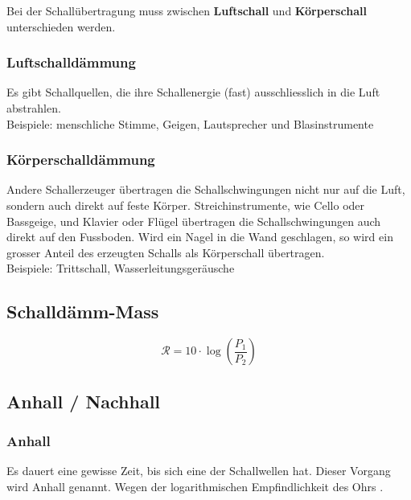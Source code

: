 Bei der Schallübertragung muss zwischen \textbf{Luftschall} und \textbf{Körperschall}
unterschieden werden.

\subsubsection{Luftschalldämmung}

Es gibt Schallquellen, die ihre Schallenergie (fast)
ausschliesslich in die Luft abstrahlen.\\
Beispiele: menschliche Stimme, Geigen, Lautsprecher und Blasinstrumente

\subsubsection{Körperschalldämmung}

Andere Schallerzeuger übertragen die Schallschwingungen nicht nur auf die
Luft, sondern auch direkt auf feste Körper. Streichinstrumente, wie Cello oder
Bassgeige, und Klavier oder Flügel übertragen die Schallschwingungen auch
direkt auf den Fussboden. Wird ein Nagel in die Wand geschlagen, so wird ein
grosser Anteil des erzeugten Schalls als Körperschall übertragen. \\
Beispiele: Trittschall, Wasserleitungsgeräusche \\




\subsection{Schalldämm-Mass}

$$ \boxed{ \mathcal{R} = 10 \cdot \log\left( \frac{P_1}{P_2} \right)  } $$



\subsection{Anhall / Nachhall}

\subsubsection{Anhall}

Es dauert eine gewisse Zeit, bis sich eine  der Schallwellen  hat. Dieser Vorgang wird Anhall genannt. Wegen der logarithmischen Empfindlichkeit des Ohrs .

